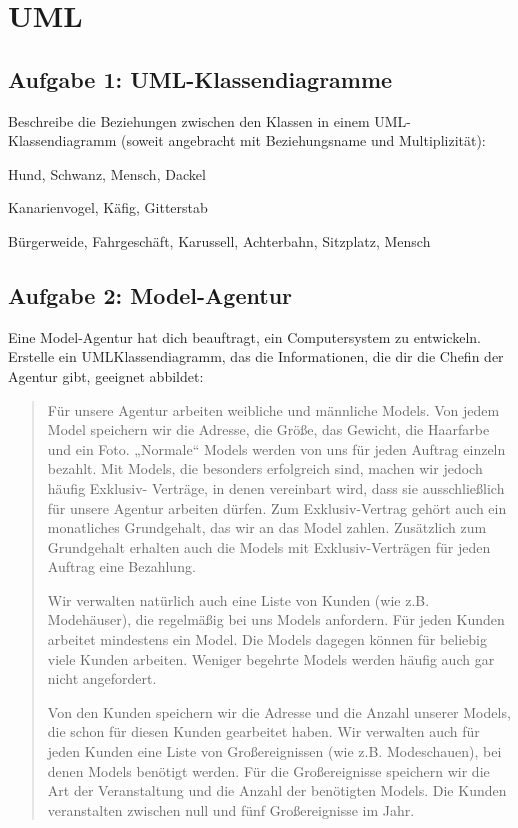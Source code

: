 \section{UML}

\subsection{Aufgabe 1: UML-Klassendiagramme}

Beschreibe die Beziehungen zwischen den Klassen in einem UML-Klassendiagramm
(soweit angebracht mit Beziehungsname und Multiplizität):

\begin{compactenum}
\item Hund, Schwanz, Mensch, Dackel
\item Kanarienvogel, Käfig, Gitterstab
\item Bürgerweide, Fahrgeschäft, Karussell, Achterbahn, Sitzplatz,
Mensch
\end{compactenum}


\subsection{Aufgabe 2: Model-Agentur}

Eine Model-Agentur hat dich beauftragt, ein Computersystem zu entwickeln.
Erstelle ein UMLKlassendiagramm, das die Informationen, die dir die Chefin der
Agentur gibt, geeignet abbildet:

\begin{quotation}
\noindent Für unsere Agentur arbeiten weibliche und männliche Models. Von jedem
Model speichern wir die Adresse, die Größe, das Gewicht, die Haarfarbe und ein
Foto. „Normale“ Models werden von uns für jeden Auftrag einzeln bezahlt. Mit
Models, die besonders erfolgreich sind, machen wir jedoch häufig Exklusiv-
Verträge, in denen vereinbart wird, dass sie ausschließlich für unsere Agentur
arbeiten dürfen. Zum Exklusiv-Vertrag gehört auch ein monatliches Grundgehalt,
das wir an das Model zahlen. Zusätzlich zum Grundgehalt erhalten auch die
Models mit Exklusiv-Verträgen für jeden Auftrag eine Bezahlung.

Wir verwalten natürlich auch eine Liste von Kunden (wie z.B. Modehäuser), die
regelmäßig bei uns Models anfordern. Für jeden Kunden arbeitet mindestens ein
Model. Die Models dagegen können für beliebig viele Kunden arbeiten. Weniger
begehrte Models werden häufig auch gar nicht angefordert.

Von den Kunden speichern wir die Adresse und die Anzahl unserer Models, die
schon für diesen Kunden gearbeitet haben. Wir verwalten auch für jeden Kunden
eine Liste von Großereignissen (wie z.B. Modeschauen), bei denen Models benötigt
werden. Für die Großereignisse speichern wir die Art der Veranstaltung und die
Anzahl der benötigten Models. Die Kunden veranstalten zwischen null und fünf
Großereignisse im Jahr.
\end{quotation}

